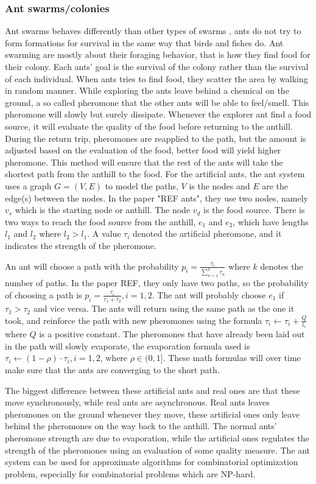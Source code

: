 \subsubsection{Ant swarms/colonies}
Ant swarms behaves differently than other types of swarms \citep{Blum2005}, ants do not try to form formations for survival in the same way that birds and fishes do. Ant swarming are mostly about their foraging behavior, that is how they find food for their colony. Each ants' goal is the survival of the colony rather than the survival of each individual. When ants tries to find food, they scatter the area by walking in random manner. While exploring the ants leave behind a chemical on the ground, a so called pheromone that the other ants will be able to feel/smell. This pheromone will slowly but surely dissipate. Whenever the explorer ant find a food source, it will evaluate the quality of the food before returning to the anthill. During the return trip, pheromones are reapplied to the path, but the amount is adjusted based on the evaluation of the food, better food will yield higher pheromone. This method will ensure that the rest of the ants will take the shortest path from the anthill to the food. For the artificial ants, the ant system uses a graph $G = (V,E)$ to model the paths, $V$ is the nodes and $E$ are the edge(s) between the nodes. In the paper "REF ants", they use two nodes, namely $v_s$ which is the starting node or anthill. The node $v_d$ is the food source. There is two ways to reach the food source from the anthill, $e_1$ and $e_2$, which have lengths $l_1$ and $l_2$ where $l_2 > l_1$. A value $\tau_i$ denoted the artificial pheromone, and it indicates the strength of the pheromone. 

An ant will choose a path with the probability $p_i = \frac{\tau_i}{\sum_{ n = 1}^{k}\tau_n}$ where $k$ denotes the number of paths. In the paper REF, they only have two paths, so the probability of choosing a path is $p_i = \frac{\tau_i}{\tau_1 + \tau_2}, i = 1,2$.
The ant will probably choose $e_1$ if $\tau_1 > \tau_2$ and vice versa.
The ants will return using the same path as the one it took, and reinforce the path with new pheromones using the formula $\tau_i \leftarrow \tau_i + \frac{Q}{l_i}$ where $Q$ is a positive constant. The pheromones that have already been laid out in the path will slowly evaporate, the evaporation formula used is $\tau_i \leftarrow (1-\rho)\cdot\tau_i, i = 1,2$, where $\rho \in (0,1]$. These math formulas will over time make sure that the ants are converging to the short path.

The biggest difference between these artificial ants and real ones are that these move synchronously, while real ants are asynchronous. Real ants leaves pheromones on the ground whenever they move, these artificial ones only leave behind the pheromones on the way back to the anthill. The normal ants' pheromone strength are due to evaporation, while the artificial ones regulates the strength of the pheromones using an evaluation of some quality measure. The ant system can be used for approximate algorithms for combinatorial optimization problem, especially for combinatorial problems which are NP-hard.